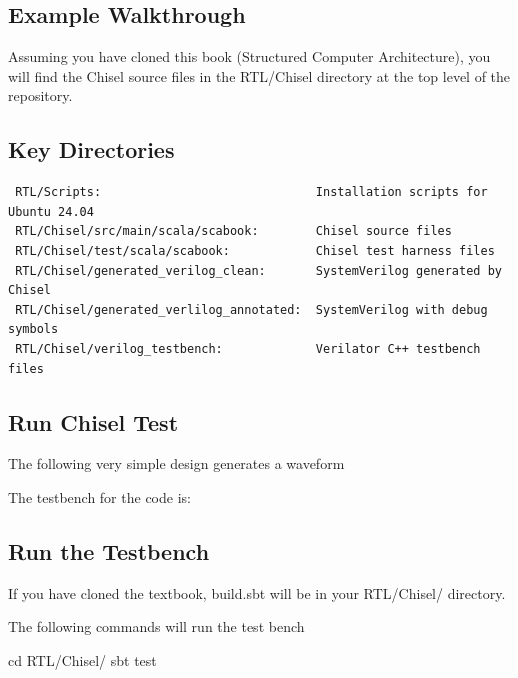 \subsection{Example Walkthrough}
Assuming you have cloned this book (Structured Computer Architecture), you will find the Chisel source files in the RTL/Chisel directory at the top level of the repository.

\subsection{Key Directories}
{\small
\begin{verbatim}
 RTL/Scripts:                              Installation scripts for Ubuntu 24.04
 RTL/Chisel/src/main/scala/scabook:        Chisel source files
 RTL/Chisel/test/scala/scabook:            Chisel test harness files
 RTL/Chisel/generated_verilog_clean:       SystemVerilog generated by Chisel 
 RTL/Chisel/generated_verlilog_annotated:  SystemVerilog with debug symbols
 RTL/Chisel/verilog_testbench:             Verilator C++ testbench files
\end{verbatim}
}

\subsection{Run Chisel Test}
The following very simple design generates a waveform

The testbench for the code is:

\subsection{Run the Testbench}
If you have cloned the textbook, build.sbt will be in your RTL/Chisel/ directory.

The following commands will run the test bench
\begin{bashcode}
cd RTL/Chisel/
sbt test
\end{bashcode}

